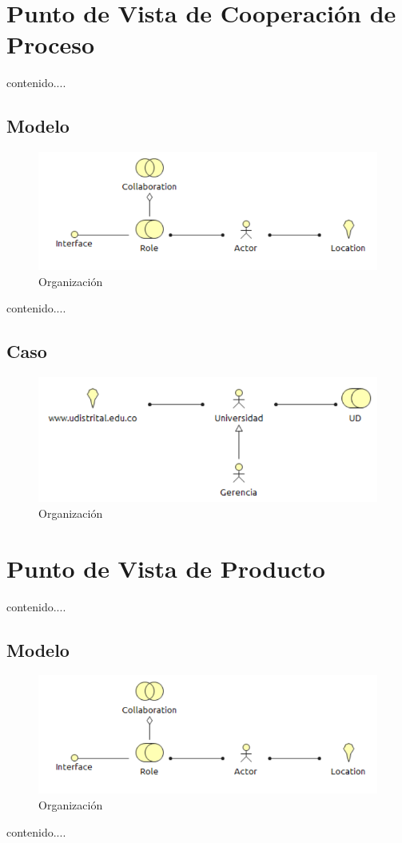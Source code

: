 \section{Punto de Vista de Cooperación de Proceso}
contenido....
\subsection{Modelo}
\begin{figure}[th!]
	\centering
	\includegraphics[width=0.8\linewidth]{arquitectura_diseno/imgs/M_Organizacion}
	\caption{Organización}
\end{figure}
\newpage
contenido....
\subsection{Caso}
\begin{figure}[th!]
	\centering
	\includegraphics[width=0.8\linewidth]{arquitectura_diseno/imgs/C_Organizacion}
	\caption{Organización}
\end{figure}
\newpage
\section{Punto de Vista de Producto}
contenido....
\subsection{Modelo}
\begin{figure}[th!]
	\centering
	\includegraphics[width=0.8\linewidth]{arquitectura_diseno/imgs/M_Organizacion}
	\caption{Organización}
\end{figure}
\newpage
contenido....
